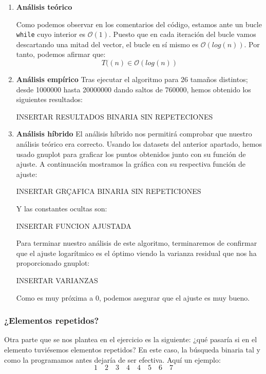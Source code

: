 \documentclass[10pt,a4paper]{article}
\begin{document}
\begin{enumerate}
 \item \textbf{Análisis teórico}
 
 
 
 Como podemos observar en los comentarios del código, estamos ante un bucle \texttt{while} cuyo interior es \(\mathcal{O}(1)\). Puesto que en cada iteración del bucle vamos descartando una mitad del vector, el bucle en sí mismo es \(\mathcal{O}(log(n))\). Por tanto, podemos afirmar que:
 \[
 	T((n) \in \mathcal{O}(log(n))
 \]
 
 \item \textbf{Análisis empírico}
 Tras ejecutar el algoritmo para 26 tamaños distintos; desde 1000000 hasta 20000000 dando saltos de 760000, hemos obtenido los siguientes resultados:
 
 INSERTAR RESULTADOS BINARIA SIN REPETECIONES
 
 \item \textbf{Análisis híbrido}
 El análisis híbrido nos permitirá comprobar que nuestro análisis teórico era correcto. Usando los datasets del anterior apartado, hemos usado gnuplot para graficar los puntos obtenidos junto con su función de ajuste. A continuación mostramos la gráfica con su respectiva función de ajuste:
 
 INSERTAR GRÇAFICA BINARIA SIN REPETICIONES
 
 Y las constantes ocultas son:
 
 INSERTAR FUNCION AJUSTADA
 
 Para terminar nuestro análisis de este algoritmo, terminaremos de confirmar que el ajuste logarítmico es el óptimo viendo la varianza residual que nos ha proporcionado gnuplot:
 
 INSERTAR VARIANZAS
 
 Como es muy próxima a 0, podemos asegurar que el ajuste es muy bueno.
\end{enumerate}

\subsubsection{¿Elementos repetidos?}
Otra parte que se nos plantea en el ejercicio es la siguiente: ¿qué pasaría si en el elemento tuviésemos elementos repetidos? En este caso, la búsqueda binaria tal y como la programamos antes dejaría de ser efectiva. Aquí un ejemplo:
\[
	1 \quad 2 \quad 3 \quad 4 \quad 4 \quad 5 \quad 6 \quad 7
\]
\end{document}
